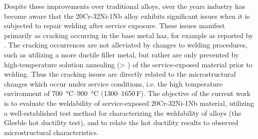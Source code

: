 Despite these improvements over traditional alloys, over the years industry has become aware \cite{api_942_2014} that the 20Cr-32Ni-1Nb alloy exhibits significant issues when it is subjected to repair welding after service exposure. These issues manifest primarily as cracking occurring in the base metal \gls{haz}, for example as reported by \citet{hoffman_weld_1998}. The cracking occurrences are not alleviated by changes to welding procedures, such as utilizing a more ductile filler metal, but rather are only prevented by high-temperature solution annealing (> ) of the service-exposed material prior to welding. Thus the cracking issues are directly related to the microstructural changes which occur under service conditions, i.e. the high temperature environment of \SIrange[range-phrase=--]{700}{900}{\degreeCelsius} (\numrange[range-phrase=--]{1300}{1650}\,\textdegree{}F). The objective of the current work is to evaluate the weldability of service-exposed 20Cr-32Ni-1Nb material, utilizing a well-established test method for characterizing the weldability of alloys (the Gleeble\textregistered{} hot ductility test), and to relate the hot ductility results to observed microstructural characteristics.












